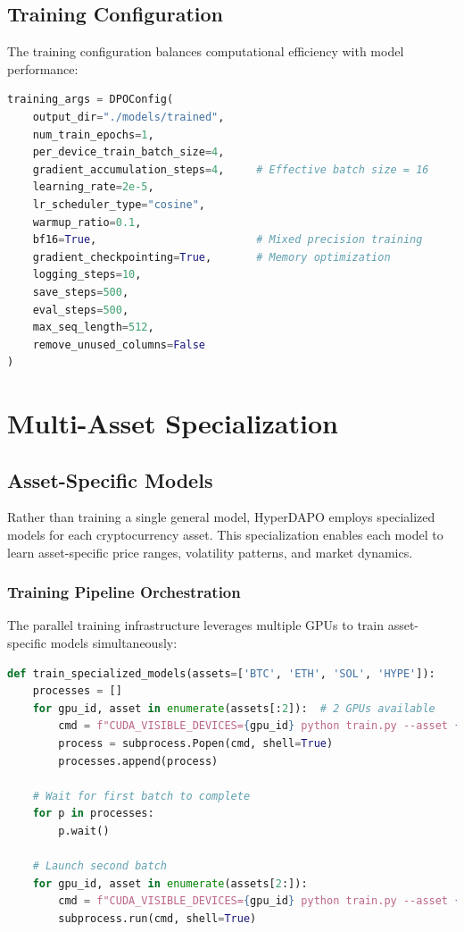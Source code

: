 \documentclass{report}
\begin{document}
\subsection{Training Configuration}

The training configuration balances computational efficiency with model performance:

\begin{lstlisting}[language=Python, caption=Training hyperparameters]
training_args = DPOConfig(
    output_dir="./models/trained",
    num_train_epochs=1,
    per_device_train_batch_size=4,
    gradient_accumulation_steps=4,     # Effective batch size = 16
    learning_rate=2e-5,
    lr_scheduler_type="cosine",
    warmup_ratio=0.1,
    bf16=True,                         # Mixed precision training
    gradient_checkpointing=True,       # Memory optimization
    logging_steps=10,
    save_steps=500,
    eval_steps=500,
    max_seq_length=512,
    remove_unused_columns=False
)
\end{lstlisting}

\section{Multi-Asset Specialization}

\subsection{Asset-Specific Models}

Rather than training a single general model, HyperDAPO employs specialized models for each cryptocurrency asset. This specialization enables each model to learn asset-specific price ranges, volatility patterns, and market dynamics.

\subsubsection{Training Pipeline Orchestration}

The parallel training infrastructure leverages multiple GPUs to train asset-specific models simultaneously:

\begin{lstlisting}[language=Python, caption=Parallel model training]
def train_specialized_models(assets=['BTC', 'ETH', 'SOL', 'HYPE']):
    processes = []
    for gpu_id, asset in enumerate(assets[:2]):  # 2 GPUs available
        cmd = f"CUDA_VISIBLE_DEVICES={gpu_id} python train.py --asset {asset}"
        process = subprocess.Popen(cmd, shell=True)
        processes.append(process)
    
    # Wait for first batch to complete
    for p in processes:
        p.wait()
    
    # Launch second batch
    for gpu_id, asset in enumerate(assets[2:]):
        cmd = f"CUDA_VISIBLE_DEVICES={gpu_id} python train.py --asset {asset}"
        subprocess.run(cmd, shell=True)
\end{lstlisting}
\end{document}
